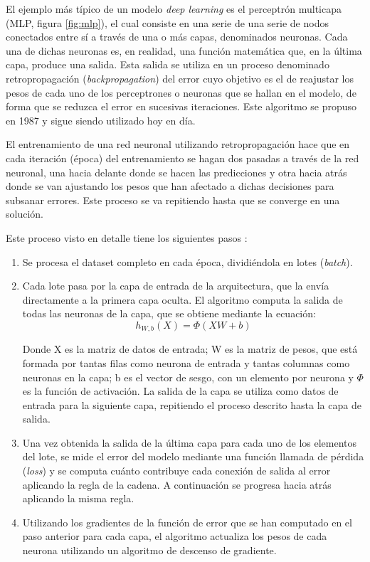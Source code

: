El ejemplo más típico de un modelo \textit{deep learning} es el perceptrón multicapa (MLP, figura \ref{fig:mlp}), el cual consiste en una serie de una serie de nodos conectados entre sí a través de una o más capas, denominados neuronas. Cada una de dichas neuronas es, en realidad, una función matemática que, en la última capa, produce una salida. Esta salida se utiliza en un proceso denominado retropropagación (\textit{backpropagation}) del error cuyo objetivo es el de reajustar los pesos de cada uno de los perceptrones o neuronas que se hallan en el modelo, de forma que se reduzca el error en sucesivas iteraciones. Este algoritmo se propuso en 1987 \cite{art:backpropagation} y sigue siendo utilizado hoy en día.

El entrenamiento de una red neuronal utilizando retropropagación hace que en cada iteración (época) del entrenamiento se hagan dos pasadas a través de la red neuronal, una hacia delante donde se hacen las predicciones y otra hacia atrás donde se van ajustando los pesos que han afectado a dichas decisiones para subsanar errores. Este proceso se va repitiendo hasta que se converge en una solución.


Este proceso visto en detalle tiene los siguientes pasos \cite{book:homl}:
\begin{enumerate}
  \item Se procesa el dataset completo en cada época, dividiéndola en lotes (\textit{batch}).
  \item Cada lote pasa por la capa de entrada de la arquitectura, que la envía directamente a la primera capa oculta. El algoritmo computa la salida de todas las neuronas de la capa, que se obtiene mediante la ecuación:
  \[
    h_{W,b}(X) = \Phi(XW+b)
  \]

  Donde X es la matriz de datos de entrada; W es la matriz de pesos, que está formada por tantas filas como neurona de entrada y tantas columnas como neuronas en la capa; b es el vector de sesgo, con un elemento por neurona y $\Phi$ es la función de activación. La salida de la capa se utiliza como datos de entrada para la siguiente capa, repitiendo el proceso descrito hasta la capa de salida.
  
  \item Una vez obtenida la salida de la última capa para cada uno de los elementos del lote, se mide el error del modelo mediante una función llamada de pérdida (\textit{loss}) y se computa cuánto contribuye cada conexión de salida al error aplicando la regla de la cadena. A continuación se progresa hacia atrás aplicando la misma regla.
  \item Utilizando los gradientes de la función de error que se han computado en el paso anterior para cada capa, el algoritmo actualiza los pesos de cada neurona utilizando un algoritmo de descenso de gradiente.
\end{enumerate}



